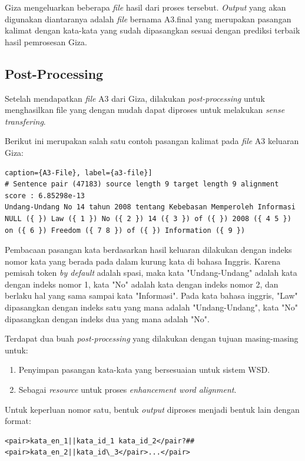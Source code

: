 Giza mengeluarkan beberapa \textit{file} hasil dari proses tersebut. \textit{Output} yang akan digunakan diantaranya adalah \textit{file} bernama A3.final yang merupakan pasangan kalimat dengan kata-kata yang sudah dipasangkan sesuai dengan prediksi terbaik hasil pemrosesan Giza.

\subsection{Post-Processing}
Setelah mendapatkan \textit{file} A3 dari Giza, dilakukan \textit{post-processing} untuk menghasilkan file yang dengan mudah dapat diproses untuk melakukan \textit{sense transfering}.

Berikut ini merupakan salah satu contoh pasangan kalimat pada \textit{file} A3 keluaran Giza:

\begin{lstlisting}caption={A3-File}, label={a3-file}]
# Sentence pair (47183) source length 9 target length 9 alignment score : 6.85298e-13
Undang-Undang No 14 tahun 2008 tentang Kebebasan Memperoleh Informasi 
NULL ({ }) Law ({ 1 }) No ({ 2 }) 14 ({ 3 }) of ({ }) 2008 ({ 4 5 }) on ({ 6 }) Freedom ({ 7 8 }) of ({ }) Information ({ 9 })
\end{lstlisting}

Pembacaan pasangan kata berdasarkan hasil keluaran dilakukan dengan indeks nomor kata yang berada pada dalam kurung kata di bahasa Inggris. Karena pemisah token \textit{by default} adalah spasi, maka kata "Undang-Undang" adalah kata dengan indeks nomor 1, kata "No" adalah kata dengan indeks nomor 2, dan berlaku hal yang sama sampai kata "Informasi". Pada kata bahasa inggris, "Law" dipasangkan dengan indeks satu yang mana adalah "Undang-Undang", kata "No" dipasangkan dengan indeks dua yang mana adalah "No". 

Terdapat dua buah \textit{post-processing} yang dilakukan dengan tujuan masing-masing untuk:

\begin{enumerate}
	\item Penyimpan pasangan kata-kata yang bersesuaian untuk sistem WSD.
	\item Sebagai \textit{resource} untuk proses \textit{enhancement word alignment}.
\end{enumerate}


Untuk keperluan nomor satu, bentuk \textit{output} diproses menjadi bentuk lain dengan format:

\begin{lstlisting}
<pair>kata_en_1||kata_id_1 kata_id_2</pair?##<pair>kata_en_2||kata_id\_3</pair>...</pair>
\end{lstlisting}

